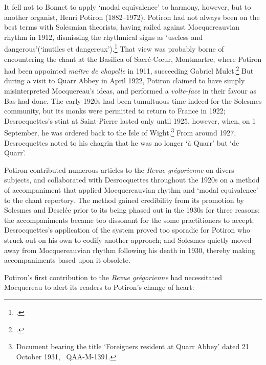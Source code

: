 It fell not to Bonnet to apply `modal equivalence' to harmony, however, but to another organist, Henri Potiron (1882--1972).
Potiron had not always been on the best terms with Solesmian theorists, having railed against Mocquereauvian rhythm in 1912, dismissing the rhythmical signs as `useless and dangerous'(`inutiles et dangereux').\footcites[unpaginated `Avant-propos']{PotironMethodeharmonieapliquee1912}
That view was probably borne of encountering the chant at the Basilica of Sacré-C\oe{}ur, Montmartre, where Potiron had been appointed \emph{maître de chapelle} in 1911, succeeding Gabriel Mulet.\footcite[608--609]{BenoistSacreCoeurMontmartre18701992}
But during a visit to Quarr Abbey in April 1922, Potiron claimed to have simply misinterpreted Mocquereau's ideas, and performed a \emph{volte-face} in their favour as Bas had done.
The early 1920s had been tumultuous time indeed for the Solesmes community, but its monks were permitted to return to France in 1922; Desrocquettes's stint at Saint-Pierre lasted only until 1925, however, when, on 1 September, he was ordered back to the Isle of Wight.\footnote{Document bearing the title `Foreigners resident at Quarr Abbey' dated 21 October 1931, \qaa{}~QAA-M-1391.}
From around 1927, Desrocquettes noted to his chagrin that he was no longer `à Quarr' but `de Quarr'.

Potiron contributed numerous articles to the \emph{Revue grégorienne} on divers subjects, and collaborated with Desrocquettes throughout the 1920s on a method of accompaniment that applied Mocquereauvian rhythm and `modal equivalence' to the chant repertory.
The method gained credibility from its promotion by Solesmes and Desclée prior to its being phased out in the 1930s for three reasons: the accompaniments became too dissonant for the some practitioners to accept; Desrocquettes's application of the system proved too sporadic for Potiron who struck out on his own to codify another approach; and Solesmes quietly moved away from Mocquereauvian rhythm following his death in 1930, thereby making accompaniments based upon it obsolete.

Potiron's first contribution to the \emph{Revue grégorienne} had necessitated Mocquereau to alert its readers to Potiron's change of heart:

